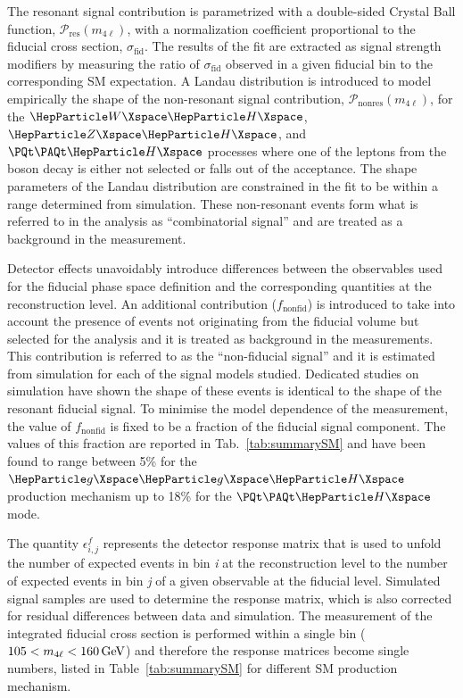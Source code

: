 The resonant signal contribution is parametrized with a double-sided Crystal Ball function, $\mathcal{P}_{\mathrm{res}}(m_{4\ell})$, with a normalization coefficient proportional to the fiducial cross section, $\sigma_{\mathrm{fid}}$.
The results of the fit are extracted as signal strength modifiers by measuring the ratio of $\sigma_{\mathrm{fid}}$  observed in a given fiducial bin to the corresponding SM expectation.
A Landau distribution is introduced to model empirically the shape of the non-resonant signal contribution, $\mathcal{P}_{\mathrm{nonres}}(m_{4\ell})$, for the $\WH$, $\ZH$, and $\ttH$ processes where one of the leptons from the \PH boson decay is either not selected or falls out of the acceptance.
The shape parameters of the Landau distribution are constrained in the fit to be within a range determined from simulation.
These non-resonant events form what is referred to in the analysis as ``combinatorial signal'' and are treated as a background in the measurement.

{ Detector effects unavoidably introduce differences between the observables used for the fiducial phase space definition and the corresponding quantities at the reconstruction level. 
An additional contribution ($f_{\mathrm{nonfid}}$) is introduced to take into account the presence of events not originating from the fiducial volume but selected for the analysis and it is treated as background in the measurements.
This contribution is referred to as the ``non-fiducial signal'' and it is estimated from simulation for each of the signal models studied.
Dedicated studies on simulation have shown the shape of these events is identical to the shape of the resonant fiducial signal. To minimise the model dependence of the measurement, the value of $f_{\mathrm{nonfid}}$ is fixed to be a fraction of the fiducial signal component.
The values of this fraction are reported in Tab.~\ref{tab:summarySM} and have been found to range between 5\% for the $\ggH$ production mechanism up to 18\% for the $\ttH$ mode.\par}

The quantity $\epsilon_{i,j}^{f}$ represents the detector response matrix that is used to unfold the number of expected events in bin \textit{i} at the reconstruction level to the number of expected events in bin \textit{j} of a given observable at the fiducial level.
Simulated signal samples are used to determine the response matrix, which is also corrected for residual differences between data and simulation.
The measurement of the integrated fiducial cross section is performed within a single bin ($105<m_{4\ell}<160\,\text{Ge\hspace{-.08em}V}$) and therefore the response matrices become single numbers, listed in Table~\ref{tab:summarySM} for different SM production mechanism.

